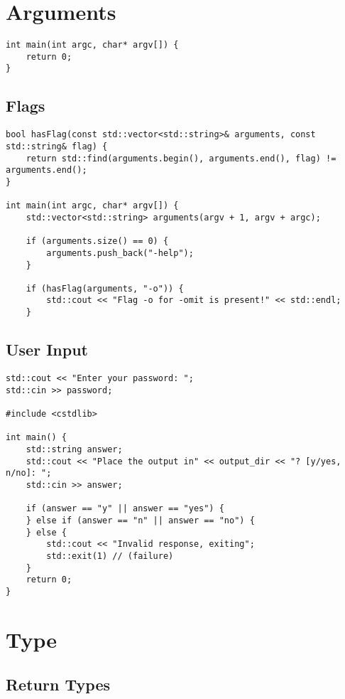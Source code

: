 \documentclass[openany]{report}
\begin{document}
\section{Arguments}

\begin{verbatim}
int main(int argc, char* argv[]) {
    return 0;
}
\end{verbatim}

\subsection{Flags}

\begin{verbatim}
bool hasFlag(const std::vector<std::string>& arguments, const std::string& flag) {
    return std::find(arguments.begin(), arguments.end(), flag) != arguments.end();
}

int main(int argc, char* argv[]) {
    std::vector<std::string> arguments(argv + 1, argv + argc);

    if (arguments.size() == 0) {
        arguments.push_back("-help");
    }

    if (hasFlag(arguments, "-o")) {
        std::cout << "Flag -o for -omit is present!" << std::endl;
    }
\end{verbatim}

\subsection{User Input}

\begin{verbatim}
std::cout << "Enter your password: ";
std::cin >> password;

#include <cstdlib>

int main() {
    std::string answer;
    std::cout << "Place the output in" << output_dir << "? [y/yes, n/no]: ";
    std::cin >> answer;

    if (answer == "y" || answer == "yes") {
    } else if (answer == "n" || answer == "no") {
    } else {
        std::cout << "Invalid response, exiting";
        std::exit(1) // (failure)
    }
    return 0;
}
\end{verbatim}



\section{Type}

\subsection{Return Types}
\end{document}
